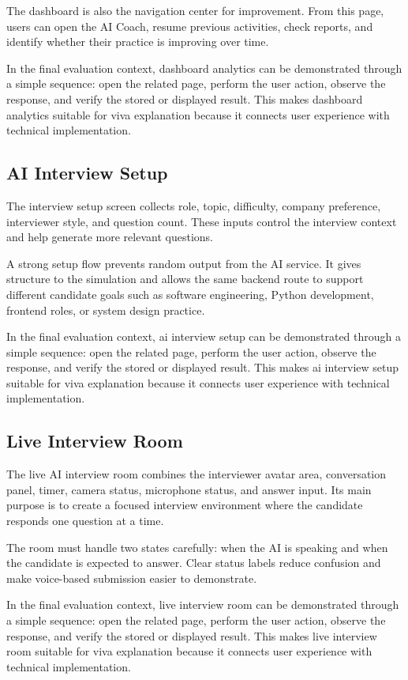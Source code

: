\documentclass[12pt,a4paper]{report}
\begin{document}
The dashboard is also the navigation center for improvement. From this page, users can open the AI Coach, resume previous activities, check reports, and identify whether their practice is improving over time.

In the final evaluation context, dashboard analytics can be demonstrated through a simple sequence: open the related page, perform the user action, observe the response, and verify the stored or displayed result. This makes dashboard analytics suitable for viva explanation because it connects user experience with technical implementation.

\subsection{AI Interview Setup}

The interview setup screen collects role, topic, difficulty, company preference, interviewer style, and question count. These inputs control the interview context and help generate more relevant questions.

A strong setup flow prevents random output from the AI service. It gives structure to the simulation and allows the same backend route to support different candidate goals such as software engineering, Python development, frontend roles, or system design practice.

In the final evaluation context, ai interview setup can be demonstrated through a simple sequence: open the related page, perform the user action, observe the response, and verify the stored or displayed result. This makes ai interview setup suitable for viva explanation because it connects user experience with technical implementation.

\subsection{Live Interview Room}

The live AI interview room combines the interviewer avatar area, conversation panel, timer, camera status, microphone status, and answer input. Its main purpose is to create a focused interview environment where the candidate responds one question at a time.

The room must handle two states carefully: when the AI is speaking and when the candidate is expected to answer. Clear status labels reduce confusion and make voice-based submission easier to demonstrate.

In the final evaluation context, live interview room can be demonstrated through a simple sequence: open the related page, perform the user action, observe the response, and verify the stored or displayed result. This makes live interview room suitable for viva explanation because it connects user experience with technical implementation.
\end{document}
